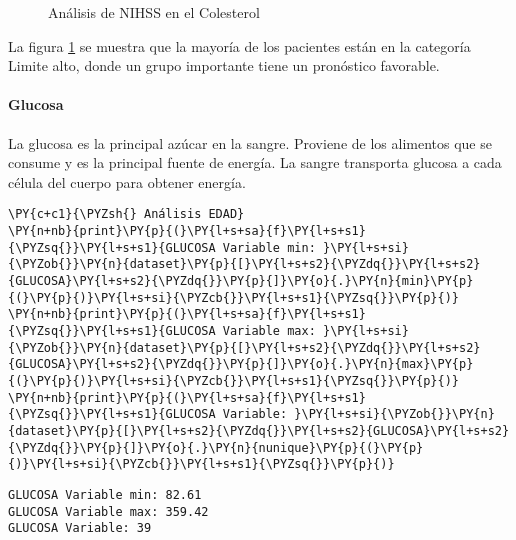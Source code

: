 \begin{center}
    	\begin{figure}[H]
	\centering
	\caption{Análisis de NIHSS en el Colesterol}
	\label{fig:aNISSc}
	\end{figure}
\end{center}
    
    La figura \ref{fig:aNISSc} se muestra que la mayoría de los pacientes están en la categoría Limite alto, donde un grupo importante tiene un pronóstico favorable.

    \hypertarget{glucosa}{%
\paragraph{Glucosa}\label{glucosa}}

La glucosa es la principal azúcar en la sangre. Proviene de los alimentos que se consume y es la principal fuente de energía. La sangre transporta glucosa a cada célula del cuerpo para obtener energía.

    \begin{tcolorbox}[breakable, size=fbox, boxrule=1pt, pad at break*=1mm,colback=cellbackground, colframe=cellborder]
\begin{Verbatim}[commandchars=\\\{\}]
\PY{c+c1}{\PYZsh{} Análisis EDAD}
\PY{n+nb}{print}\PY{p}{(}\PY{l+s+sa}{f}\PY{l+s+s1}{\PYZsq{}}\PY{l+s+s1}{GLUCOSA Variable min: }\PY{l+s+si}{\PYZob{}}\PY{n}{dataset}\PY{p}{[}\PY{l+s+s2}{\PYZdq{}}\PY{l+s+s2}{GLUCOSA}\PY{l+s+s2}{\PYZdq{}}\PY{p}{]}\PY{o}{.}\PY{n}{min}\PY{p}{(}\PY{p}{)}\PY{l+s+si}{\PYZcb{}}\PY{l+s+s1}{\PYZsq{}}\PY{p}{)}
\PY{n+nb}{print}\PY{p}{(}\PY{l+s+sa}{f}\PY{l+s+s1}{\PYZsq{}}\PY{l+s+s1}{GLUCOSA Variable max: }\PY{l+s+si}{\PYZob{}}\PY{n}{dataset}\PY{p}{[}\PY{l+s+s2}{\PYZdq{}}\PY{l+s+s2}{GLUCOSA}\PY{l+s+s2}{\PYZdq{}}\PY{p}{]}\PY{o}{.}\PY{n}{max}\PY{p}{(}\PY{p}{)}\PY{l+s+si}{\PYZcb{}}\PY{l+s+s1}{\PYZsq{}}\PY{p}{)}
\PY{n+nb}{print}\PY{p}{(}\PY{l+s+sa}{f}\PY{l+s+s1}{\PYZsq{}}\PY{l+s+s1}{GLUCOSA Variable: }\PY{l+s+si}{\PYZob{}}\PY{n}{dataset}\PY{p}{[}\PY{l+s+s2}{\PYZdq{}}\PY{l+s+s2}{GLUCOSA}\PY{l+s+s2}{\PYZdq{}}\PY{p}{]}\PY{o}{.}\PY{n}{nunique}\PY{p}{(}\PY{p}{)}\PY{l+s+si}{\PYZcb{}}\PY{l+s+s1}{\PYZsq{}}\PY{p}{)}
\end{Verbatim}
\end{tcolorbox}

    \begin{Verbatim}[commandchars=\\\{\}]
GLUCOSA Variable min: 82.61
GLUCOSA Variable max: 359.42
GLUCOSA Variable: 39
    \end{Verbatim}

